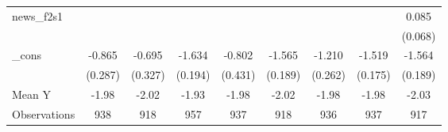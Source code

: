 {\begin{tabular}{l*{8}{c}}
\addlinespace
news\_f2s1   &                     &                     &                     &                     &                     &                     &                     &       0.085         \\
            &                     &                     &                     &                     &                     &                     &                     &     (0.068)         \\
\addlinespace
\_cons      &      -0.865\sym{***}&      -0.695\sym{**} &      -1.634\sym{***}&      -0.802\sym{*}  &      -1.565\sym{***}&      -1.210\sym{***}&      -1.519\sym{***}&      -1.564\sym{***}\\
            &     (0.287)         &     (0.327)         &     (0.194)         &     (0.431)         &     (0.189)         &     (0.262)         &     (0.175)         &     (0.189)         \\
\midrule
Mean Y      &       -1.98         &       -2.02         &       -1.93         &       -1.98         &       -2.02         &       -1.98         &       -1.98         &       -2.03         \\
Observations&         938         &         918         &         957         &         937         &         918         &         936         &         937         &         917         \\
\bottomrule
\end{tabular}
}
